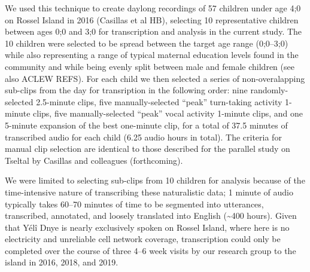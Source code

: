 \documentclass[floatsintext,man]{apa6}
\theoremstyle{definition}
\theoremstyle{definition}
\theoremstyle{definition}
\theoremstyle{remark}
\begin{document}
We used this technique to create daylong recordings of 57 children under
age 4;0 on Rossel Island in 2016 (Casillas et al HB), selecting 10
representative children between ages 0;0 and 3;0 for transcription and
analysis in the current study. The 10 children were selected to be
spread between the target age range (0;0--3;0) while also representing a
range of typical maternal education levels found in the community and
while being evenly split between male and female children (see also
ACLEW REFS). For each child we then selected a series of
non-overalapping sub-clips from the day for transription in the
following order: nine randomly-selected 2.5-minute clips, five
manually-selected \enquote{peak} turn-taking activity 1-minute clips,
five manually-selected \enquote{peak} vocal activity 1-minute clips, and
one 5-minute expansion of the best one-minute clip, for a total of 37.5
minutes of transcribed audio for each child (6.25 audio hours in total).
The criteria for manual clip selection are identical to those described
for the parallel study on Tseltal by Casillas and colleagues
(forthcoming).

We were limited to selecting sub-clips from 10 children for analysis
because of the time-intensive nature of transcribing these naturalistic
data; 1 minute of audio typically takes 60--70 minutes of time to be
segmented into utterances, transcribed, annotated, and loosely
translated into English (\textasciitilde{}400 hours). Given that Yélî
Dnye is nearly exclusively spoken on Rossel Island, where here is no
electricity and unreliable cell network coverage, transcription could
only be completed over the course of three 4--6 week visits by our
research group to the island in 2016, 2018, and 2019.
\end{document}
